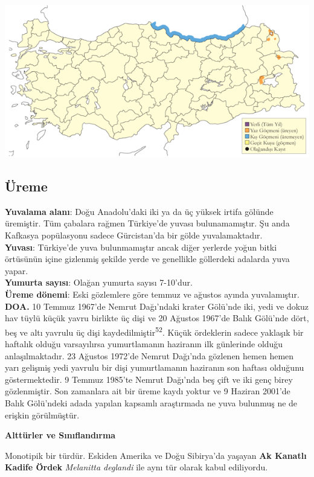 \documentclass[
  letterpaper,
  DIV=11,
  numbers=noendperiod]{scrreprt}
\begin{document}
\includegraphics{images/harita_Page_028.png}

\hypertarget{uxfcreme-27}{%
\subsection{\texorpdfstring{\textbf{Üreme}}{Üreme}}\label{uxfcreme-27}}

\textbf{Yuvalama alanı}: Doğu Anadolu'daki iki ya da üç yüksek irtifa
gölünde üremiştir. Tüm çabalara rağmen Türkiye'de yuvası bulunamamıştır.
Şu anda Kafkasya popülasyonu sadece Gürcistan'da bir gölde
yuvalamaktadır.\\
\textbf{Yuvası}: Türkiye'de yuva bulunmamıştır ancak diğer yerlerde
yoğun bitki örtüsünün içine gizlenmiş şekilde yerde ve genellikle
göllerdeki adalarda yuva yapar.\\
\textbf{Yumurta sayısı}: Olağan yumurta sayısı 7-10'dur.\\
\textbf{Üreme dönemi}: Eski gözlemlere göre temmuz ve ağustos ayında
yuvalamıştır. \textbf{DOA.} 10 Temmuz 1967'de Nemrut Dağı'ndaki krater
Gölü'nde iki, yedi ve dokuz hav tüylü küçük yavru birlikte üç dişi ve 20
Ağustos 1967'de Balık Gölü'nde dört, beş ve altı yavrulu üç dişi
kaydedilmiştir\textsuperscript{52}. Küçük ördeklerin sadece yaklaşık bir
haftalık olduğu varsayılırsa yumurtlamanın haziranın ilk günlerinde
olduğu anlaşılmaktadır. 23 Ağustos 1972'de Nemrut Dağı'nda gözlenen
hemen hemen yarı gelişmiş yedi yavrulu bir dişi yumurtlamanın haziranın
son haftası olduğunu göstermektedir. 9 Temmuz 1985'te Nemrut Dağı'nda
beş çift ve iki genç birey gözlenmiştir. Son zamanlara ait bir üreme
kaydı yoktur ve 9 Haziran 2001'de Balık Gölü'ndeki adada yapılan
kapsamlı araştırmada ne yuva bulunmuş ne de erişkin görülmüştür.

\textbf{Alttürler ve Sınıflandırma}

Monotipik bir türdür. Eskiden Amerika ve Doğu Sibirya'da yaşayan
\textbf{Ak Kanatlı Kadife Ördek} \emph{Melanitta deglandi} ile aynı tür
olarak kabul ediliyordu.
\end{document}
